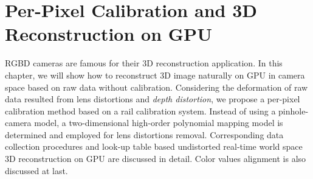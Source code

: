 \chapter{Per-Pixel Calibration and \gls{3D} Reconstruction on \gls{GPU}} %
\label{chapterDataBasedCalibration} 
%
%
%


%
%
%
%
\gls{RGBD} cameras are famous for their \gls{3D} reconstruction application. In this chapter, we will show how to reconstruct \gls{3D} image naturally on \gls{GPU} in camera space based on raw data without calibration. Considering the deformation of raw data resulted from lens distortions and \emph{depth distortion}, we propose a per-pixel calibration method based on a rail calibration system. Instead of using a pinhole-camera model, a two-dimensional high-order polynomial mapping model is determined and employed for lens distortions removal. Corresponding data collection procedures and look-up table based undistorted real-time world space \gls{3D} reconstruction on \gls{GPU} are discussed in detail. Color values alignment is also discussed at last.
%
